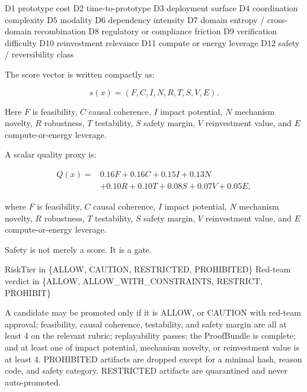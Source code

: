 \documentclass[
  11pt,
]{article}
\newenvironment{Shaded}{}{}
\newcommand{\NormalTok}[1]{#1}
\begin{document}
\begin{Shaded}
\begin{Highlighting}[]
\NormalTok{D1 prototype cost}
\NormalTok{D2 time{-}to{-}prototype}
\NormalTok{D3 deployment surface}
\NormalTok{D4 coordination complexity}
\NormalTok{D5 modality}
\NormalTok{D6 dependency intensity}
\NormalTok{D7 domain entropy / cross{-}domain recombination}
\NormalTok{D8 regulatory or compliance friction}
\NormalTok{D9 verification difficulty}
\NormalTok{D10 reinvestment relevance}
\NormalTok{D11 compute or energy leverage}
\NormalTok{D12 safety / reversibility class}
\end{Highlighting}
\end{Shaded}

The score vector is written compactly as:

\[
s(x)=(F,C,I,N,R,T,S,V,E).
\]

Here \(F\) is feasibility, \(C\) causal coherence, \(I\) impact
potential, \(N\) mechanism novelty, \(R\) robustness, \(T\) testability,
\(S\) safety margin, \(V\) reinvestment value, and \(E\)
compute-or-energy leverage.

A scalar quality proxy is:

\[
\begin{aligned}
Q(x)=&
0.16F + 0.16C + 0.15I + 0.13N\\
&+0.10R + 0.10T + 0.08S + 0.07V + 0.05E,
\end{aligned}
\]

where \(F\) is feasibility, \(C\) causal coherence, \(I\) impact
potential, \(N\) mechanism novelty, \(R\) robustness, \(T\) testability,
\(S\) safety margin, \(V\) reinvestment value, and \(E\)
compute-or-energy leverage.

Safety is not merely a score. It is a gate.

\begin{Shaded}
\begin{Highlighting}[]
\NormalTok{RiskTier in \{ALLOW, CAUTION, RESTRICTED, PROHIBITED\}}
\NormalTok{Red{-}team verdict in \{ALLOW, ALLOW\_WITH\_CONSTRAINTS, RESTRICT, PROHIBIT\}}
\end{Highlighting}
\end{Shaded}

A candidate may be promoted only if it is ALLOW, or CAUTION with
red-team approval; feasibility, causal coherence, testability, and
safety margin are all at least 4 on the relevant rubric; replayability
passes; the ProofBundle is complete; and at least one of impact
potential, mechanism novelty, or reinvestment value is at least 4.
PROHIBITED artifacts are dropped except for a minimal hash, reason code,
and safety category. RESTRICTED artifacts are quarantined and never
auto-promoted.
\end{document}
